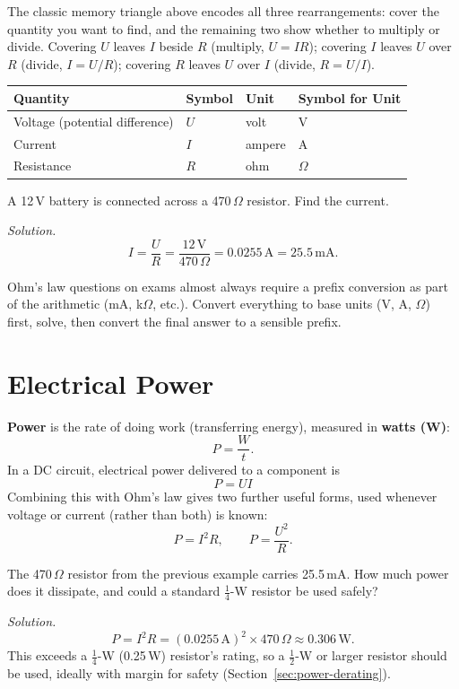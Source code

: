 The classic memory triangle above encodes all three rearrangements: cover
the quantity you want to find, and the remaining two show whether to
multiply or divide. Covering $U$ leaves $I$ beside $R$ (multiply, $U=IR$);
covering $I$ leaves $U$ over $R$ (divide, $I=U/R$); covering $R$ leaves
$U$ over $I$ (divide, $R=U/I$).

\begin{center}
\begin{tabular}{@{}llll@{}}
\toprule
Quantity & Symbol & Unit & Symbol for Unit \\
\midrule
Voltage (potential difference) & $U$ & volt & V \\
Current & $I$ & ampere & A \\
Resistance & $R$ & ohm & $\Omega$ \\
\bottomrule
\end{tabular}
\end{center}

\begin{examplebox}
A 12\,V battery is connected across a 470\,$\Omega$ resistor. Find the
current.

\emph{Solution.}
\[
I = \frac{U}{R} = \frac{12\,\text{V}}{470\,\Omega} = 0.0255\,\text{A} = 25.5\,\text{mA}.
\]
\end{examplebox}

\begin{examtip}
Ohm's law questions on exams almost always require a prefix conversion as
part of the arithmetic (mA, k$\Omega$, etc.). Convert everything to base
units (V, A, $\Omega$) first, solve, then convert the final answer to a
sensible prefix.
\end{examtip}

\section{Electrical Power}

\textbf{Power} is the rate of doing work (transferring energy), measured
in \textbf{watts (W)}:
\[
P = \frac{W}{t}.
\]
In a DC circuit, electrical power delivered to a component is
\[
\boxed{P = UI}
\]
Combining this with Ohm's law gives two further useful forms, used
whenever voltage or current (rather than both) is known:
\[
P = I^{2}R, \qquad P = \frac{U^{2}}{R}.
\]

\begin{examplebox}
The 470\,$\Omega$ resistor from the previous example carries 25.5\,mA.
How much power does it dissipate, and could a standard $\tfrac{1}{4}$-W
resistor be used safely?

\emph{Solution.}
\[
P = I^2 R = (0.0255\,\text{A})^2 \times 470\,\Omega \approx 0.306\,\text{W}.
\]
This exceeds a $\tfrac{1}{4}$-W (0.25\,W) resistor's rating, so a
$\tfrac{1}{2}$-W or larger resistor should be used, ideally with margin
for safety (Section~\ref{sec:power-derating}).
\end{examplebox}

